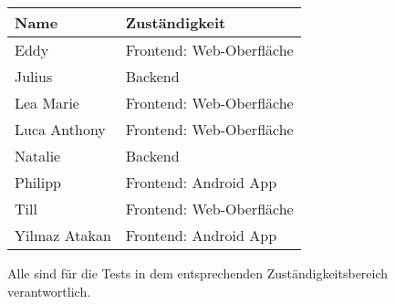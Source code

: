 \begin{tabular}{ll}
 \rowcolor[HTML]{E7E7E7} 
 \textbf{Name} & \textbf{Zuständigkeit} \\ \hline
 Eddy & Frontend: Web-Oberfläche \\ 
 \rowcolor[HTML]{E7E7E7} 
 Julius & Backend \\ 
 Lea Marie & Frontend: Web-Oberfläche \\ 
 \rowcolor[HTML]{E7E7E7}
 Luca Anthony & Frontend: Web-Oberfläche \\ 
 Natalie & Backend \\ 
 \rowcolor[HTML]{E7E7E7}
 Philipp &  Frontend: Android App \\ 
 Till & Frontend: Web-Oberfläche \\ 
 \rowcolor[HTML]{E7E7E7}
 Yilmaz Atakan & Frontend: Android App \\ 
\end{tabular}

Alle sind für die Tests in dem entsprechenden Zuständigkeitsbereich verantwortlich.


